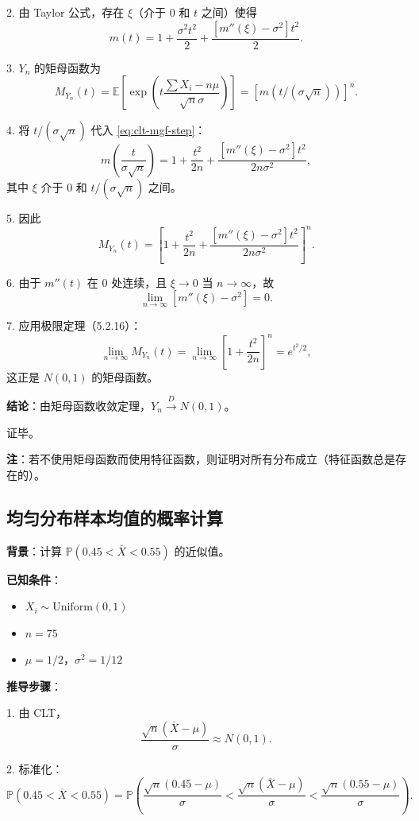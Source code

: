 2. 由 Taylor 公式，存在 $\xi$（介于 $0$ 和 $t$ 之间）使得
\[
m(t) = 1 + \frac{\sigma^2 t^2}{2} + \frac{[m''(\xi) - \sigma^2]t^2}{2}.
\label{eq:clt-mgf-step}
\]

3. $Y_n$ 的矩母函数为
\[
M_{Y_n}(t) = \mathbb{E}\left[\exp\left(t\frac{\sum X_i - n\mu}{\sqrt{n}\sigma}\right)\right] = [m(t/(\sigma\sqrt{n}))]^n.
\label{eq:clt-mgf}
\]

4. 将 $t/(\sigma\sqrt{n})$ 代入 \eqref{eq:clt-mgf-step}：
\[
m\left(\frac{t}{\sigma\sqrt{n}}\right) = 1 + \frac{t^2}{2n} + \frac{[m''(\xi) - \sigma^2]t^2}{2n\sigma^2},
\]
其中 $\xi$ 介于 $0$ 和 $t/(\sigma\sqrt{n})$ 之间。

5. 因此
\[
M_{Y_n}(t) = \left[1 + \frac{t^2}{2n} + \frac{[m''(\xi) - \sigma^2]t^2}{2n\sigma^2}\right]^n.
\]

6. 由于 $m''(t)$ 在 $0$ 处连续，且 $\xi \to 0$ 当 $n \to \infty$，故
\[
\lim_{n \to \infty} [m''(\xi) - \sigma^2] = 0.
\]

7. 应用极限定理（5.2.16）：
\[
\lim_{n \to \infty} M_{Y_n}(t) = \lim_{n \to \infty} \left[1 + \frac{t^2}{2n}\right]^n = e^{t^2/2},
\]
这正是 $N(0,1)$ 的矩母函数。

\textbf{结论}：由矩母函数收敛定理，$Y_n \xrightarrow{D} N(0,1)$。

证毕。

\textbf{注}：若不使用矩母函数而使用特征函数，则证明对所有分布成立（特征函数总是存在的）。

\subsection{均匀分布样本均值的概率计算}\label{sec:uniform-mean-probability}

\textbf{背景}：计算 $\mathbb{P}(0.45 < \overline{X} < 0.55)$ 的近似值。

\textbf{已知条件}：
\begin{itemize}
\item $X_i \sim \mathrm{Uniform}(0,1)$
\item $n = 75$
\item $\mu = 1/2$，$\sigma^2 = 1/12$
\end{itemize}

\textbf{推导步骤}：

1. 由 CLT，
\[
\frac{\sqrt{n}(\overline{X} - \mu)}{\sigma} \approx N(0,1).
\]

2. 标准化：
\[
\mathbb{P}(0.45 < \overline{X} < 0.55) = \mathbb{P}\left(\frac{\sqrt{n}(0.45 - \mu)}{\sigma} < \frac{\sqrt{n}(\overline{X} - \mu)}{\sigma} < \frac{\sqrt{n}(0.55 - \mu)}{\sigma}\right).
\]

